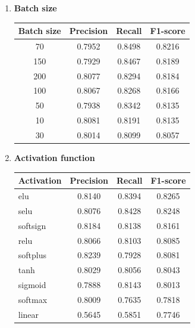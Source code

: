 \begin{enumerate}

    \item \textbf{Batch size} \\
        \vspace{-1cm}
        \begin{table}[htbp]
            \centering
            \begin{tabular}{c|c|c|c}
            \textbf{Batch size} & \textbf{Precision} & \textbf{Recall} & \textbf{F1-score} \\ \hline
                70      &	0.7952    &	0.8498    &	0.8216 \\
                150     &	0.7929    &	0.8467    &	0.8189 \\
                200     &	0.8077    &	0.8294    &	0.8184 \\
                100     &	0.8067    &	0.8268    &	0.8166 \\
                50      &	0.7938    &	0.8342    &	0.8135 \\
                10      &	0.8081    &	0.8191    &	0.8135 \\
                30      &	0.8014    &	0.8099    &	0.8057 \\
            \end{tabular}
        \end{table}        
    


    \item \textbf{Activation function}\\
        \vspace{-0.6cm}
        \begin{table}[htbp]
            \centering
            \begin{tabular}{l|c|c|c}
            \textbf{Activation} & \textbf{Precision} & \textbf{Recall} & \textbf{F1-score} \\ \hline
            elu         &	0.8140    &	0.8394    &	0.8265 \\
            selu        &	0.8076    &	0.8428    &	0.8248 \\
            softsign    &	0.8184    &	0.8138    &	0.8161 \\
            relu        &	0.8066    &	0.8103    &	0.8085 \\
            softplus    &	0.8239    &	0.7928    &	0.8081 \\
            tanh        &	0.8029    &	0.8056    &	0.8043 \\
            sigmoid     &	0.7888    &	0.8143    &	0.8013 \\
            softmax     &	0.8009    &	0.7635    &	0.7818 \\
            linear      &	0.5645    &	0.5851    &	0.7746 \\
            \end{tabular}
        \end{table}
    

\end{enumerate}
